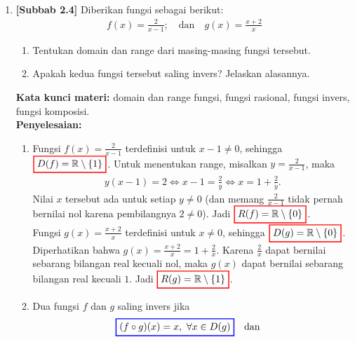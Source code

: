 \documentclass[10pt,openany,a4paper]{article}
\theoremstyle{definition}
\theoremstyle{definition}
\theoremstyle{plain}
\newenvironment{jawab}[2][tes]{%
\par\noindent\textbf{Kata kunci materi:} #1.\\
\textbf{Penyelesaian:} #2%
}{}
\begin{document}
\begin{enumerate}
    \item \textbf{[Subbab 2.4]} Diberikan fungsi sebagai berikut:
    \begin{align*}
        f(x)=\frac{2}{x-1};\quad \text{dan}\quad g(x)=\frac{x+2}{x}
    \end{align*}
    \begin{enumerate}
        \item Tentukan domain dan range dari masing-masing fungsi tersebut.
        \item Apakah kedua fungsi tersebut saling invers? Jelaskan alasannya.
    \end{enumerate}
    \begin{jawab}[domain dan range fungsi, fungsi rasional, fungsi invers, fungsi komposisi]{
        \begin{enumerate}
            \item Fungsi $f(x)=\frac{2}{x-1}$ terdefinisi untuk $x-1\neq 0$, sehingga $\colorlet{oldcolor}{.}
        \color{red}
        \setlength{\fboxrule}{1pt} \boxed{\color{oldcolor}D(f)=\mathbb{R}\setminus\{1\}}\color{oldcolor}$. Untuk menentukan range, misalkan $y=\frac{2}{x-1}$, maka
            \begin{align*}
                y(x-1) = 2 \iff x - 1 = \frac{2}{y} \iff x = 1+\frac{2}{y}.
            \end{align*}
            Nilai $x$ tersebut ada untuk setiap $y\neq 0$ (dan memang $\frac{2}{x-1}$ tidak pernah bernilai nol karena pembilangnya $2\neq 0$). Jadi $\colorlet{oldcolor}{.}
        \color{red}
        \setlength{\fboxrule}{1pt} \boxed{\color{oldcolor}R(f)=\mathbb{R}\setminus\{0\}}\color{oldcolor}$.\\
            Fungsi $g(x)=\frac{x+2}{x}$ terdefinisi untuk $x\neq 0$, sehingga $\colorlet{oldcolor}{.}
        \color{red}
        \setlength{\fboxrule}{1pt} \boxed{\color{oldcolor}D(g)=\mathbb{R}\setminus\{0\}}\color{oldcolor}$. Diperhatikan bahwa $g(x)=\frac{x+2}{x}=1+\frac{2}{x}$. Karena $\frac{2}{x}$ dapat bernilai sebarang bilangan real kecuali nol, maka $g(x)$ dapat bernilai sebarang bilangan real kecuali $1$. Jadi $\colorlet{oldcolor}{.}
        \color{red}
        \setlength{\fboxrule}{1pt} \boxed{\color{oldcolor}R(g)=\mathbb{R}\setminus\{1\}}\color{oldcolor}$.
            \item Dua fungsi $f$ dan $g$ saling invers jika
            \begin{align*}
                \colorlet{oldcolor}{.}
        \color{blue}
        \setlength{\fboxrule}{1pt} \boxed{\color{oldcolor}(f\circ g)(x)=x,~\forall x\in D(g)}\color{oldcolor} \quad\text{dan}\quad \colorlet{oldcolor}{.}

\end{align*}
\end{enumerate}}
\end{jawab}
\end{enumerate}
\end{document}
